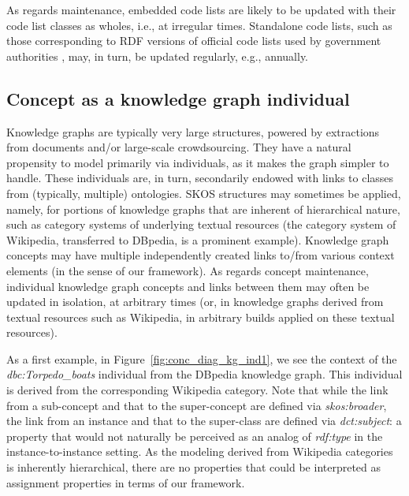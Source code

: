 As regards maintenance, embedded code lists are likely to be updated with their code list classes as wholes, i.e., at irregular times.
Standalone code lists, such as those corresponding to RDF versions of official code lists used by government authorities \cite{DBLP:conf/smap/FilippidisKKIB16}, may, in turn, be updated regularly, e.g., annually.

\subsection{Concept as a knowledge graph individual}

Knowledge graphs are typically very large structures, powered by extractions from documents and/or large-scale crowdsourcing.
They have a natural propensity to model primarily via individuals, as it makes the graph simpler to handle.
These individuals are, in turn, secondarily endowed with links to classes from (typically, multiple) ontologies.
SKOS structures may sometimes be applied, namely, for portions of knowledge graphs that are inherent of hierarchical nature, such as category systems of underlying textual resources (the category system of Wikipedia, transferred to DBpedia, is a prominent example).
Knowledge graph concepts may have multiple independently created links to/from various context elements (in the sense of our framework).
As regards concept maintenance, individual knowledge graph concepts and links between them may often be updated in isolation, at arbitrary times (or, in knowledge graphs derived from textual resources such as Wikipedia, in arbitrary builds applied on these textual resources).

As a first example, in Figure~\ref{fig:conc_diag_kg_ind1}, we see the context of the \emph{dbc:Torpedo\_boats} individual from the DBpedia knowledge graph.
This individual is derived from the corresponding Wikipedia category.
Note that while the link from a sub-concept and that to the super-concept are defined via \emph{skos:broader}, the link from an instance and that to the super-class are defined via \emph{dct:subject}: a property that would not naturally be perceived as an analog of \emph{rdf:type} in the instance-to-instance setting.  
As the modeling derived from Wikipedia categories is inherently hierarchical, there are no properties that could be interpreted as assignment properties in terms of our framework.

